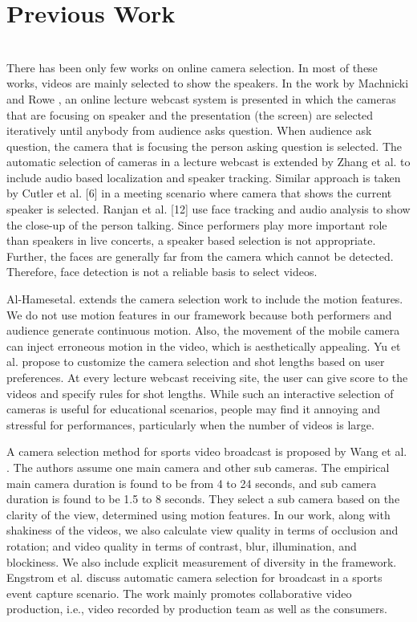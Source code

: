 \documentclass{sig-alternate}
\providecommand{\DIFadd}[1]{{\protect\color{blue}\uwave{#1}}} %
\providecommand{\DIFaddbegin}{} %
\providecommand{\DIFaddend}{} %
\newcommand{\DIFaddincludegraphics}[2][]{{\color{blue}\fbox{\DIFOincludegraphics[#1]{#2}}}} %
\DeclareRobustCommand{\DIFaddbegin}{\DIFOaddbegin \let\includegraphics\DIFaddincludegraphics} %
\DeclareRobustCommand{\DIFaddend}{\DIFOaddend \let\includegraphics\DIFOincludegraphics} %
\begin{document}
\section{Previous Work}
\DIFaddbegin \DIFadd{See, you have to wait if you wnt to view the changes.}\\

\DIFaddend There has been only few works on online camera selection. In most of these works, videos are mainly selected to show the speakers. In the work by Machnicki and Rowe \cite{piron1976foundations}, an online lecture webcast system is presented in which the cameras that are focusing on speaker and the presentation (the screen) are selected iteratively until anybody from audience asks question. When audience ask question, the camera that is focusing the person asking question is selected. The automatic selection of cameras in a lecture webcast is extended by Zhang et al. \cite{talay1994numerical} to include audio based localization and speaker tracking. Similar approach is taken by Cutler et al. [6] in a meeting scenario where camera that shows the current speaker is selected. Ranjan et al. [12] use face tracking and audio analysis to show the close-up of the person talking. Since performers play more important role than speakers in live concerts, a speaker based selection is not appropriate. Further, the faces are generally far from the camera which cannot be detected. Therefore, face detection is not a reliable basis to select videos.

 Al-Hamesetal.\cite{coddington1955theory} extends the camera selection work to include the motion features. We do not use motion features in our framework because both performers and audience generate continuous motion. Also, the movement of the mobile camera can inject erroneous motion in the video, which is aesthetically appealing. Yu et al. \cite{shampine1975computer} propose to customize the camera selection and shot lengths based on user preferences. At every lecture webcast receiving site, the user can give score to the videos and specify rules for shot lengths. While such an interactive selection of cameras is useful for educational scenarios, people may ﬁnd it annoying and stressful for performances, particularly when the number of videos is large. 

 A camera selection method for sports video broadcast is proposed by Wang et al. \cite{carter2007ceramic}. The authors assume one main camera and other sub cameras. The empirical main camera duration is found to be from 4 to 24 seconds, and sub camera duration is found to be 1.5 to 8 seconds. They select a sub camera based on the clarity of the view, determined using motion features. In our work, along with shakiness of the videos, we also calculate view quality in terms of occlusion and rotation; and video quality in terms of contrast, blur, illumination, and blockiness. We also include explicit measurement of diversity in the framework. Engstrom et al. \cite{frakes1992information} discuss automatic camera selection for broadcast in a sports event capture scenario. The work mainly promotes collaborative video production, i.e., video recorded by production team as well as the consumers.
\end{document}

